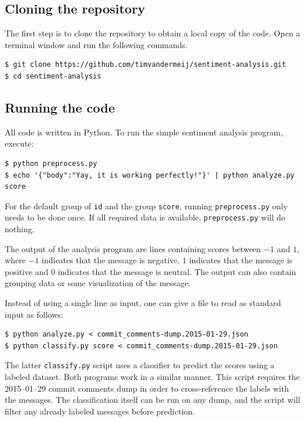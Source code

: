 \documentclass{article}
\begin{document}
\subsection{Cloning the repository}\label{app:cloning-the-repository}
The first step is to clone the repository to obtain a local copy of the code. 
Open a terminal window and run the following commands.

\begin{verbatim}
$ git clone https://github.com/timvandermeij/sentiment-analysis.git
$ cd sentiment-analysis
\end{verbatim}

\subsection{Running the code}\label{app:running-the-code}
All code is written in Python. To run the simple sentiment analysis program, execute:

\begin{verbatim}
$ python preprocess.py
$ echo '{"body":"Yay, it is working perfectly!"}' | python analyze.py score
\end{verbatim}

For the default group of \texttt{id} and the group \texttt{score}, running
\texttt{preprocess.py} only needs to be done once. If all required data is
available, \texttt{preprocess.py} will do nothing.

The output of the analysis program are lines containing scores between $-1$ and 
$1$, where $-1$ indicates that the message is negative, $1$ indicates that the 
message is positive and $0$ indicates that the message is neutral. The output 
can also contain grouping data or some visualization of the message.

Instead of using a single line as input, one can give a file to read as standard
input as follows:

\begin{verbatim}
$ python analyze.py < commit_comments-dump.2015-01-29.json
$ python classify.py score < commit_comments-dump.2015-01-29.json
\end{verbatim}

The latter \texttt{classify.py} script uses a classifier to predict the scores 
using a labeled dataset. Both programs work in a similar manner. This script 
requires the 2015--01--29 commit comments dump in order to 
cross-reference the labels with the messages. The classification itself can be 
run on any dump, and the script will filter any already labeled messages before 
prediction.
\end{document}
